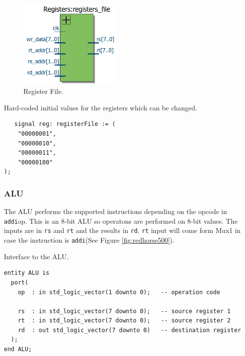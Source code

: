 \documentclass[a4paper, 11pt,oneside]{article}
\begin{document}
\begin{figure}[H]
	\begin{center}
	\includegraphics[width=2in]{rf.png}
	\caption{Register File.}
	\label{fig:rf} 
	\end{center}
\end{figure}

\begin{listing}[H]
\caption{Hard-coded initial values for the registers which can be changed.}
\label{code:rf_values}
\begin{verbatim}
   signal reg: registerFile := (
    "00000001",
    "00000010",
    "00000011",
    "00000100"
);
\end{verbatim}
\end{listing}

\subsubsection{ALU}
The ALU performs the supported instructions depending on the opcode in 
\texttt{addi}{op}. This is an 8-bit ALU so operatons are performed on 
8-bit values. The inputs are in \texttt{rs} and \texttt{rt} 
and the results in \texttt{rd}. \texttt{rt} input will come 
form Mux1 in case the instruction is \texttt{addi}(See Figure 
\ref{fig:redhorse500}).

\begin{listing}[H]
\caption{Interface to the ALU.}
\label{code:alu}
\begin{verbatim}
entity ALU is
  port(
    op  : in std_logic_vector(1 downto 0);   -- operation code

    rs  : in std_logic_vector(7 downto 0);   -- source register 1
    rt  : in std_logic_vector(7 downto 0);   -- source register 2
    rd  : out std_logic_vector(7 downto 0)   -- destination register
  );
end ALU;

\end{verbatim}
\end{listing}
\end{document}
